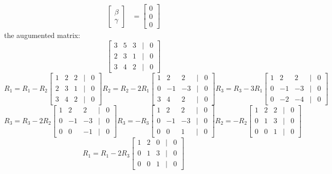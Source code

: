 \documentclass[11pt]{article}
\begin{document}
\begin{enumerate}
\begin{enumerate}
\[\begin{aligned}
\begin{bmatrix}
        \beta \\
        \gamma
    \end{bmatrix}
    &= \begin{bmatrix}
        0 \\
        0 \\
        0
    \end{bmatrix}
\end{aligned}
\]
the augumented matrix:
\[
\begin{bmatrix}
    3 & 5 & 3 &|& 0 \\
    2 & 3 & 1 &|& 0 \\
    3 & 4 & 2 &|& 0
\end{bmatrix}
\]
\[
R_1 = R_1 - R_2
\begin{bmatrix}
    1 & 2 & 2 &|& 0 \\
    2 & 3 & 1 &|& 0 \\
    3 & 4 & 2 &|& 0
\end{bmatrix}
R_2 = R_2 - 2R_1
\begin{bmatrix}
    1 & 2 & 2 &|& 0 \\
    0 & -1 & -3 &|& 0 \\
    3 & 4 & 2 &|& 0
\end{bmatrix}
R_3 = R_3 - 3R_1
\begin{bmatrix}
    1 & 2 & 2 &|& 0 \\
    0 & -1 & -3 &|& 0 \\
    0 & -2 & -4 &|& 0
\end{bmatrix}
\]
\[
R_3 = R_3 - 2R_2
\begin{bmatrix}
    1 & 2 & 2 &|& 0 \\
    0 & -1 & -3 &|& 0 \\
    0 & 0 & -1 &|& 0
\end{bmatrix}
R_3 = -R_3
\begin{bmatrix}
    1 & 2 & 2 &|& 0 \\
    0 & -1 & -3 &|& 0 \\
    0 & 0 & 1 &|& 0
\end{bmatrix}
R_2 = -R_2
\begin{bmatrix}
    1 & 2 & 2 &|& 0 \\
    0 & 1 & 3 &|& 0 \\
    0 & 0 & 1 &|& 0
\end{bmatrix}
\]
\[
R_1 = R_1 - 2R_3
\begin{bmatrix}
    1 & 2 & 0 &|& 0 \\
    0 & 1 & 3 &|& 0 \\
    0 & 0 & 1 &|& 0
\end{bmatrix}
\]
\end{enumerate}
\end{enumerate}
\end{document}

